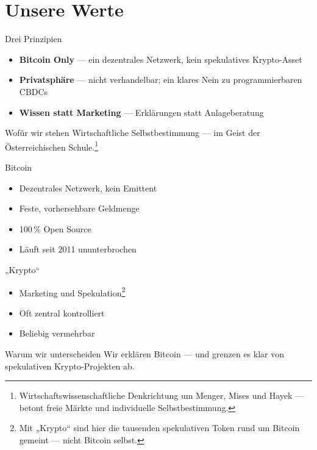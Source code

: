 
\section{Unsere Werte}

\begin{frame}{Drei Prinzipien}
  \begin{itemize}
    \item \textbf{Bitcoin Only} — ein dezentrales Netzwerk, kein spekulatives
      Krypto-Asset
    \item \textbf{Privatsphäre} — nicht verhandelbar; ein klares Nein zu
      programmierbaren CBDCs
    \item \textbf{Wissen statt Marketing} — Erklärungen statt Anlageberatung
  \end{itemize}

  \vfill
  \begin{alertblock}{Wofür wir stehen}
    Wirtschaftliche Selbstbestimmung — im Geist der Österreichischen
    Schule.\footnote{Wirtschaftswissenschaftliche Denkrichtung um Menger, Mises
      und Hayek — betont freie Märkte und individuelle Selbstbestimmung.}
  \end{alertblock}
\end{frame}

%
  {Bitcoin}{%
    \begin{itemize}
      \item Dezentrales Netzwerk, kein Emittent
      \item Feste, vorhersehbare Geldmenge
      \item 100\,\% Open Source
      \item Läuft seit 2011 ununterbrochen
    \end{itemize}}%
  {„Krypto“}{%
    \begin{itemize}
      \item Marketing und Spekulation\footnote{Mit „Krypto“ sind hier die
        tausenden spekulativen Token rund um Bitcoin gemeint — nicht Bitcoin
        selbst.}
      \item Oft zentral kontrolliert
      \item Beliebig vermehrbar
    \end{itemize}}%
  {Warum wir unterscheiden}{%
    Wir erklären Bitcoin — und grenzen es klar von spekulativen
    Krypto-Projekten ab.}

